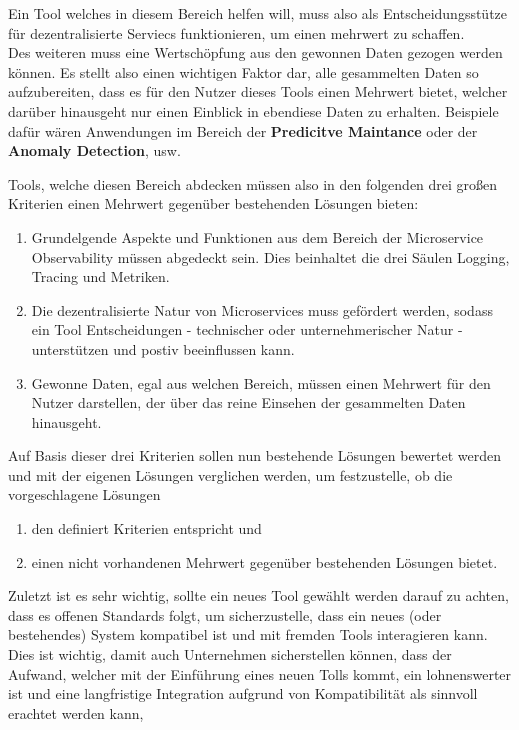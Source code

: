 \documentclass[
	12pt,
	BCOR=5mm,
	DIV=12,
	headinclude=on,
	footinclude=off,
	parskip=half,
	bibliography=totoc,
	listof=entryprefix,
	toc=listof,
	numbers=noenddot,
	plainfootsepline
]{scrreprt}
\begin{document}
Ein Tool welches in diesem Bereich helfen will, muss also als Entscheidungsstütze für dezentralisierte Serviecs funktionieren, um einen mehrwert zu schaffen. \\
Des weiteren muss eine Wertschöpfung aus den gewonnen Daten gezogen werden können. Es stellt also einen wichtigen Faktor dar, alle gesammelten Daten so aufzubereiten, dass es für den Nutzer dieses Tools einen Mehrwert bietet, welcher darüber hinausgeht nur einen Einblick in ebendiese Daten zu erhalten. Beispiele dafür wären Anwendungen im Bereich der \textbf{Predicitve Maintance} oder der \textbf{Anomaly Detection}, usw.

Tools, welche diesen Bereich abdecken müssen also in den folgenden drei großen Kriterien einen Mehrwert gegenüber bestehenden Lösungen bieten:

\begin{enumerate}
	\item Grundelgende Aspekte und Funktionen aus dem Bereich der Microservice Observability müssen abgedeckt sein. Dies beinhaltet die drei Säulen Logging, Tracing und Metriken.
	\item Die dezentralisierte Natur von Microservices muss gefördert werden, sodass ein Tool Entscheidungen - technischer oder unternehmerischer Natur - unterstützen und postiv beeinflussen kann.
	\item Gewonne Daten, egal aus welchen Bereich, müssen einen Mehrwert für den Nutzer darstellen, der über das reine Einsehen der gesammelten Daten hinausgeht.
\end{enumerate}

Auf Basis dieser drei Kriterien sollen nun bestehende Lösungen bewertet werden und mit der eigenen Lösungen verglichen werden, um festzustelle, ob die vorgeschlagene Lösungen
\begin{enumerate}
	\item den definiert Kriterien entspricht und
	\item einen nicht vorhandenen Mehrwert gegenüber bestehenden Lösungen bietet.
\end{enumerate}

Zuletzt ist es sehr wichtig, sollte ein neues Tool gewählt werden darauf zu achten, dass es offenen Standards folgt, um sicherzustelle, dass ein neues (oder bestehendes) System kompatibel ist und mit fremden Tools interagieren kann. Dies ist wichtig, damit auch Unternehmen sicherstellen können, dass der Aufwand, welcher mit der Einführung eines neuen Tolls kommt, ein lohnenswerter ist und eine langfristige Integration aufgrund von Kompatibilität als sinnvoll erachtet werden kann,
\end{document}
